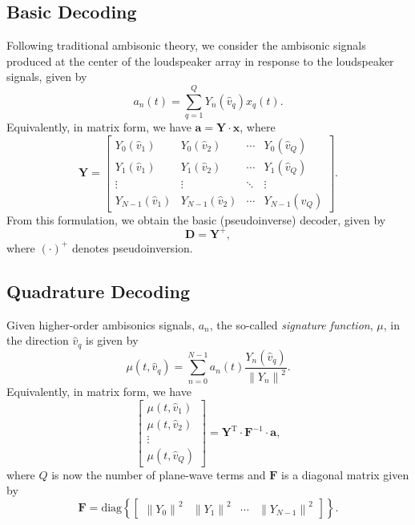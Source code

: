 \documentclass[11pt, oneside]{article}
\begin{document}
\subsection{Basic Decoding}
Following traditional ambisonic theory,
we consider the ambisonic signals produced at the center of the loudspeaker array
in response to the loudspeaker signals, given by
\begin{equation}
a_n(t) = \sum_{q=1}^{Q} Y_{n}(\hat{v}_q) x_q(t).
\end{equation}
Equivalently, in matrix form, we have $\mathbf{a} = \mathbf{Y} \cdot \mathbf{x}$, where
\begin{equation}\label{eq:YMatrix}
\mathbf{Y} = 
\begin{bmatrix}
Y_{0}(\hat{v}_1) & Y_{0}(\hat{v}_2) & \cdots & Y_{0}(\hat{v}_Q) \\
Y_{1}(\hat{v}_1) & Y_{1}(\hat{v}_2) & \cdots & Y_{1}(\hat{v}_Q) \\
\vdots & \vdots & \ddots & \vdots \\
Y_{N-1}(\hat{v}_1) & Y_{N-1}(\hat{v}_2) & \cdots & Y_{N-1}(\hat{v}_Q)
\end{bmatrix}.
\end{equation}
From this formulation, we obtain the basic (pseudoinverse) decoder, given by~\citep[Appendix~A.1]{Heller2008}
\begin{equation}\label{eq:PinvDecoder}
\mathbf{D} = \mathbf{Y}^{+},
\end{equation}
where $(\cdot)^{+}$ denotes pseudoinversion.

\subsection{Quadrature Decoding}
Given higher-order ambisonics signals, $a_n$, the so-called \textit{signature function}, $\mu$, in the direction $\hat{v}_q$ is given by~\citep{Duraiswami2005a}
\begin{equation}\label{eq:A2mu}
\mu(t,\hat{v}_q) = \sum_{n=0}^{N-1} a_n(t) \frac{Y_n(\hat{v}_q)}{\left\|Y_n\right\|^2}.
\end{equation}
Equivalently, in matrix form, we have
\begin{equation}
\begin{bmatrix}
\mu(t,\hat{v}_1) \\ \mu(t,\hat{v}_2) \\ \vdots \\ \mu(t,\hat{v}_Q)
\end{bmatrix} 
= \mathbf{Y}^{\textrm{T}} \cdot \mathbf{F}^{-1} \cdot \mathbf{a},
\end{equation}
where $Q$ is now the number of plane-wave terms and $\mathbf{F}$ is a diagonal matrix given by
\begin{equation}
\mathbf{F} = \text{diag} \left\{ \begin{bmatrix} \left\|Y_0\right\|^{2} & \left\|Y_1\right\|^{2} & \cdots & \left\|Y_{N-1}\right\|^{2} \end{bmatrix} \right\}.
\end{equation}
\end{document}
